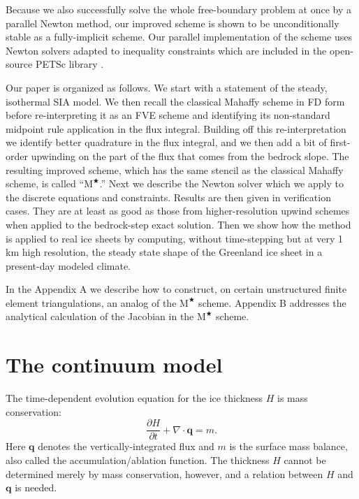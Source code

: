 \documentclass[twocolumn,letterpaper]{igs}
\newcommand\bq{\mathbf{q}}
\newcommand{\Div}{\nabla\cdot}
\newcommand{\Mstar}{$\text{M}^{\bigstar}$\xspace}
\begin{document}
Because we also successfully solve the whole free-boundary problem at once by a parallel Newton method, our improved scheme is shown to be unconditionally stable as a fully-implicit scheme.  Our parallel implementation of the scheme uses Newton solvers adapted to inequality constraints \citep{BensonMunson2006} which are included in the open-source PETSc library \citep{Balayetal2014}.

Our paper is organized as follows.  We start with a statement of the steady, isothermal SIA model.  We then recall the classical Mahaffy scheme in FD form before re-interpreting it as an FVE scheme and identifying its non-standard midpoint rule application in the flux integral.  Building off this re-interpretation we identify better quadrature in the flux integral, and we then add a bit of first-order upwinding on the part of the flux that comes from the bedrock slope.  The resulting improved scheme, which has the same stencil as the classical Mahaffy scheme, is called ``\Mstar.''  Next we describe the Newton solver which we apply to the discrete equations and constraints.  Results are then given in verification cases.  They are at least as good as those from higher-resolution upwind schemes when applied to the \cite{JaroschSchoofAnslow2013} bedrock-step exact solution.  Then we show how the method is applied to real ice sheets by computing, without time-stepping but at very 1 km high resolution, the steady state shape of the Greenland ice sheet in a present-day modeled climate.

In the Appendix A we describe how to construct, on certain unstructured finite element triangulations, an analog of the \Mstar scheme.  Appendix B addresses the analytical calculation of the Jacobian in the \Mstar scheme.


\section*{The continuum model}

The time-dependent evolution equation for the ice thickness $H$ is mass conservation:
\begin{equation}
\frac{\partial H}{\partial t} + \Div \bq = m.  \label{eq:siaevolution}
\end{equation}
Here $\bq$ denotes the vertically-integrated flux and $m$ is the surface mass balance, also called the accumulation/ablation function.  The thickness $H$ cannot be determined merely by mass conservation, however, and a relation between $H$ and $\bq$ is needed.
\end{document}
